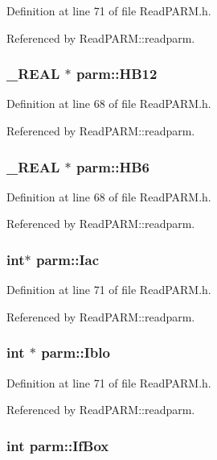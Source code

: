 Definition at line 71 of file Read\-PARM.h.

Referenced by Read\-PARM::readparm.
\subsubsection{\setlength{\rightskip}{0pt plus 5cm}\_\-REAL $\ast$ parm::HB12}\label{structparm_m48}




Definition at line 68 of file Read\-PARM.h.

Referenced by Read\-PARM::readparm.
\subsubsection{\setlength{\rightskip}{0pt plus 5cm}\_\-REAL $\ast$ parm::HB6}\label{structparm_m49}




Definition at line 68 of file Read\-PARM.h.

Referenced by Read\-PARM::readparm.
\subsubsection{\setlength{\rightskip}{0pt plus 5cm}int$\ast$ parm::Iac}\label{structparm_m55}




Definition at line 71 of file Read\-PARM.h.

Referenced by Read\-PARM::readparm.
\subsubsection{\setlength{\rightskip}{0pt plus 5cm}int $\ast$ parm::Iblo}\label{structparm_m56}




Definition at line 71 of file Read\-PARM.h.

Referenced by Read\-PARM::readparm.
\subsubsection{\setlength{\rightskip}{0pt plus 5cm}int parm::If\-Box}\label{structparm_m1}




